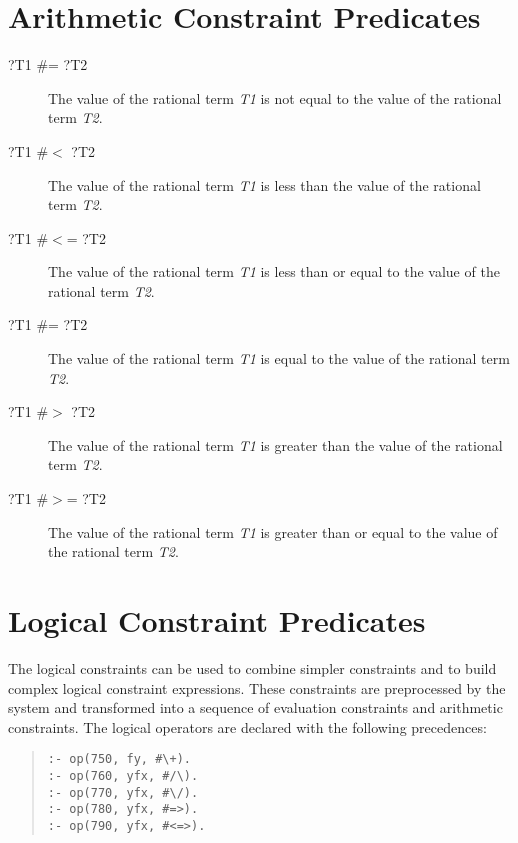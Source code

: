 \section{Arithmetic Constraint Predicates}
\begin{description}
\item[?T1 \#\bsl= ?T2]
The value of the rational term {\it T1} is not equal to the value of the
rational term {\it T2}.

\item[?T1 \#$<$ ?T2]
The value of the rational term {\it T1} is less than the value of the
rational term {\it T2}.

\item[?T1 \#$<$= ?T2]
The value of the rational term {\it T1} is less than or equal to the value of the
rational term {\it T2}.

\item[?T1 \#= ?T2]
The value of the rational term {\it T1} is equal to the
value of the rational term {\it T2}.

\item[?T1 \#$>$ ?T2]
The value of the rational term {\it T1} is greater than the
value of the rational term {\it T2}.

\item[?T1 \#$>$= ?T2]
The value of the rational term {\it T1} is greater than or equal to the
value of the rational term {\it T2}.

\end{description}

\section{Logical Constraint Predicates}
The logical constraints can be used to combine simpler constraints
and to build complex logical constraint expressions.
These constraints are preprocessed by the system and transformed
into a sequence of evaluation constraints and arithmetic constraints.
The logical operators are declared with the following precedences:
\begin{quote}
\begin{verbatim}
:- op(750, fy, #\+).
:- op(760, yfx, #/\).
:- op(770, yfx, #\/).
:- op(780, yfx, #=>).
:- op(790, yfx, #<=>).
\end{verbatim}
\end{quote}

